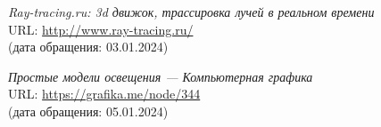 \begin{thebibliography}{99}
    
    {\itshape Ray-tracing.ru: 3d движок, трассировка лучей в реальном времени}\\
    URL: \url{http://www.ray-tracing.ru/}\\
    (дата обращения: 03.01.2024)
    
    {\itshape Простые модели освещения --- Компьютерная графика}\\
    URL: \url{https://grafika.me/node/344}\\
    (дата обращения: 05.01.2024)

\end{thebibliography}

